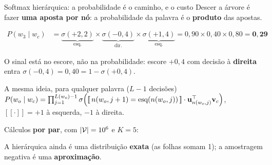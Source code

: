 \begin{frame}{Softmax hierárquica: a probabilidade é o caminho, e o custo}
    \footnotesize
    Descer a árvore é fazer \textbf{uma aposta por nó}: a probabilidade da palavra é o \textbf{produto} das apostas.

    \vspace{-0.05cm}
    {\centering
    $\begin{aligned}
        P(w_3 \mid w_c) &=
        \underbrace{\sigma(+2{,}2)}_{\text{esq.}} \times
        \underbrace{\sigma(-0{,}4)}_{\text{dir.}} \times
        \underbrace{\sigma(+1{,}4)}_{\text{esq.}}
        = 0{,}90 \times 0{,}40 \times 0{,}80 = \mathbf{0{,}29}
    \end{aligned}$
    \par}

    \vspace{0.05cm}
    {\scriptsize O sinal está no escore, não na probabilidade: escore $+0{,}4$ com decisão à \textbf{direita} entra $\sigma(-0{,}4) = 0{,}40 = 1-\sigma(+0{,}4)$.\par}

    \vspace{0.1cm}
    \begin{block}{A mesma ideia, para qualquer palavra ($L-1$ decisões)}
        \scriptsize
        $P(w_o \mid w_c) = \prod_{j=1}^{L(w_o)-1} \sigma\Big( [\![\, n(w_o, j+1) = \text{esq}(n(w_o, j)) \,]\!] \cdot \mathbf{u}_{n(w_o, j)}^\top \mathbf{v}_c \Big)$,
        \quad $[\![\cdot]\!] = +1$ à esquerda, $-1$ à direita.
    \end{block}

    \vspace{0.1cm}
    {\scriptsize Cálculos \textbf{por par}, com $|\mathcal{V}| = 10^6$ e $K = 5$:\par}
    \vspace{0.05cm}
    {\centering
    \par}
    \vspace{0.05cm}
    {\scriptsize A hierárquica ainda é uma distribuição \textbf{exata} (as folhas somam 1); a amostragem negativa é uma \textbf{aproximação}.\par}


\end{frame}
